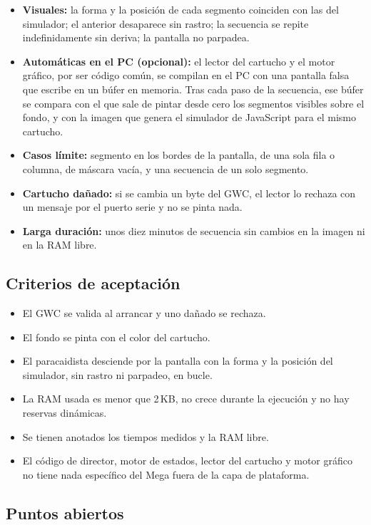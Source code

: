\begin{itemize}
	\item \textbf{Visuales:} la forma y la posición de cada segmento coinciden con las del simulador; el anterior desaparece sin rastro; la secuencia se repite indefinidamente sin deriva; la pantalla no parpadea.
	\item \textbf{Automáticas en el PC (opcional):} el lector del cartucho y el motor gráfico, por ser código común, se compilan en el PC con una pantalla falsa que escribe en un búfer en memoria. Tras cada paso de la secuencia, ese búfer se compara con el que sale de pintar desde cero los segmentos visibles sobre el fondo, y con la imagen que genera el simulador de JavaScript para el mismo cartucho.
	\item \textbf{Casos límite:} segmento en los bordes de la pantalla, de una sola fila o columna, de máscara vacía, y una secuencia de un solo segmento.
	\item \textbf{Cartucho dañado:} si se cambia un byte del GWC, el lector lo rechaza con un mensaje por el puerto serie y no se pinta nada.
	\item \textbf{Larga duración:} unos diez minutos de secuencia sin cambios en la imagen ni en la RAM libre.
\end{itemize}

\subsection{Criterios de aceptación}
\label{sec:F6I02Criterios}

\begin{itemize}
	\item El GWC se valida al arrancar y uno dañado se rechaza.
	\item El fondo se pinta con el color del cartucho.
	\item El paracaidista desciende por la pantalla con la forma y la posición del simulador, sin rastro ni parpadeo, en bucle.
	\item La RAM usada es menor que 2\,KB, no crece durante la ejecución y no hay reservas dinámicas.
	\item Se tienen anotados los tiempos medidos y la RAM libre.
	\item El código de director, motor de estados, lector del cartucho y motor gráfico no tiene nada específico del Mega fuera de la capa de plataforma.
\end{itemize}

\subsection{Puntos abiertos}
\label{sec:F6I02Abiertos}

